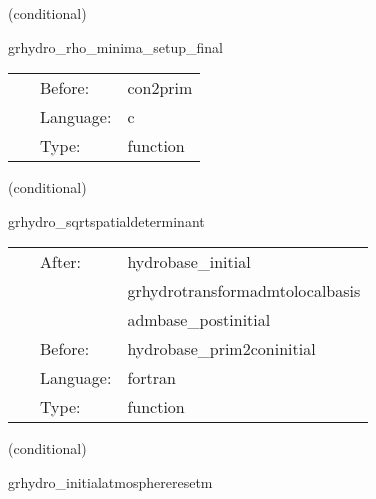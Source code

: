 \vspace{5mm}

   (conditional) 

\hspace{5mm} grhydro\_rho\_minima\_setup\_final 

\hspace{5mm}{\it set the value of the rest-mass density of the atmosphere which will be used during the evolution } 


\hspace{5mm}

 \begin{tabular*}{160mm}{cll} 
~ & Before:  & con2prim \\ 
~ & Language:  & c \\ 
~ & Type:  & function \\ 
\end{tabular*} 


\vspace{5mm}

   (conditional) 

\hspace{5mm} grhydro\_sqrtspatialdeterminant 

\hspace{5mm}{\it calculate sdetg } 


\hspace{5mm}

 \begin{tabular*}{160mm}{cll} 
~ & After:  & hydrobase\_initial \\ 
~& ~ &grhydrotransformadmtolocalbasis\\ 
~& ~ &admbase\_postinitial\\ 
~ & Before:  & hydrobase\_prim2coninitial \\ 
~ & Language:  & fortran \\ 
~ & Type:  & function \\ 
\end{tabular*} 


\vspace{5mm}

   (conditional) 

\hspace{5mm} grhydro\_initialatmosphereresetm 

\hspace{5mm}{\it use mask to enforce atmosphere at initial time } 


\hspace{5mm}

